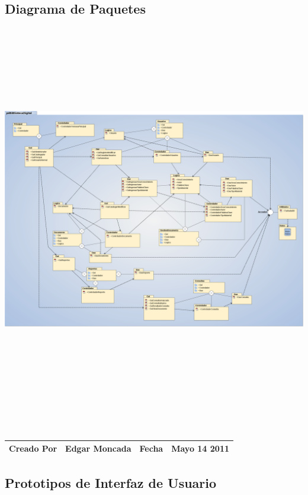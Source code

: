 \subsection{Diagrama de Paquetes}
	\begin{minipage}[c]{1\linewidth}
	    \centering
        \includegraphics[width=19.5cm, height=17cm, angle=90]{diagramaPaquetes}
    \end{minipage}\\[.3cm]
       	
    \begin{tabular}{|p{3.5cm}|p{4.5cm}|p{2.5cm}|p{4.5cm}|}\hline
	{\bf Creado Por} & {Edgar Moncada} & {\bf Fecha} & {Mayo 14 2011}\\
	\hline
	\end{tabular}
	
\subsection{Prototipos de Interfaz de Usuario}


